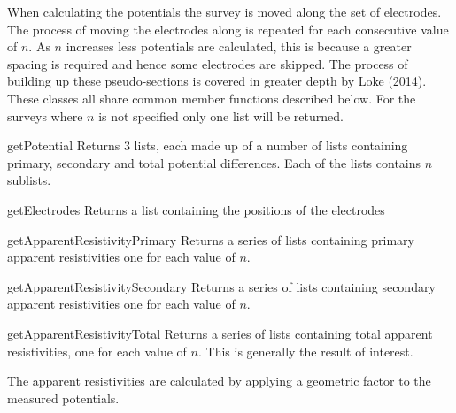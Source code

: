 When calculating the potentials the survey is moved along the set of electrodes.
The process of moving the electrodes along is repeated for each consecutive value of $n$.
As $n$ increases less potentials are calculated, this is because a greater spacing is
required and hence some electrodes are skipped. The process of building up these
pseudo-sections is covered in greater depth by Loke (2014)\cite[pg 19]{LOKE2014}.
These classes all share common member functions described below. For the surveys
where $n$ is not specified only one list will be returned. 

\begin{methoddesc}[]{getPotential}{}
Returns 3 lists, each made up of a number of lists containing primary, secondary and total
potential differences. Each of the lists contains $n$ sublists.
\end{methoddesc}

\begin{methoddesc}[]{getElectrodes}{}
Returns a list containing the positions of the electrodes
\end{methoddesc}

\begin{methoddesc}[]{getApparentResistivityPrimary}{}
Returns a series of lists containing primary apparent resistivities one for each 
value of $n$.
\end{methoddesc}

\begin{methoddesc}[]{getApparentResistivitySecondary}{}
Returns a series of lists containing secondary apparent resistivities one for each 
value of $n$.
\end{methoddesc}

\begin{methoddesc}[]{getApparentResistivityTotal}{}
Returns a series of lists containing total apparent resistivities, one for each 
value of $n$. This is generally the result of interest.
\end{methoddesc}

The apparent resistivities are calculated by applying a geometric factor to the
measured potentials.
